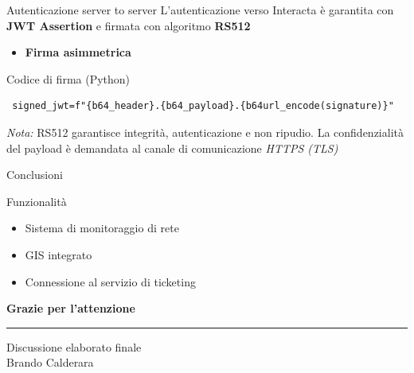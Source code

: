 \documentclass[aspectratio=169]{beamer}
\begin{document}
\begin{frame}[fragile]{Autenticazione server to server}
    L'autenticazione verso Interacta è garantita con \textbf{JWT Assertion} e firmata con algoritmo \textbf{RS512}
    \begin{itemize}
        \item \textbf{Firma asimmetrica}
    \end{itemize}
    \vspace{0.3cm}
    \begin{exampleblock}{Codice di firma (Python)}
        \begin{verbatim}
 signed_jwt=f"{b64_header}.{b64_payload}.{b64url_encode(signature)}"
        \end{verbatim}
    \end{exampleblock}
    \textit{Nota:} RS512 garantisce integrità, autenticazione e non ripudio. La confidenzialità del payload è demandata al canale di comunicazione \textit{HTTPS (TLS)}
\end{frame}
\begin{frame}{Conclusioni}
    \begin{block}{Funzionalità}
        \begin{itemize}
            \setlength{\itemsep}{1.2em} %
            \item Sistema di monitoraggio di rete\hfill \textcolor{DarkGreen}{\checkmark}\hspace{1.2cm} \vspace{-0.3cm}
            \item GIS integrato \hfill \textcolor{DarkGreen}{\checkmark} \hspace{1.2cm}\vspace{-0.3cm}
            \item Connessione al servizio di ticketing \hfill \textcolor{DarkGreen}{\checkmark}\hspace{1.2cm} \vspace{0cm}
        \end{itemize}
    \end{block}


    \centering
    \vspace{1cm}

    {\Large \textbf{Grazie per l'attenzione}}

    \rule{0.5\textwidth}{1pt}


    {\large Discussione elaborato finale\\Brando Calderara}

\end{frame}
\end{document}

